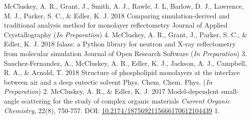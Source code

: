 \begin{cvpubys}
  \cvpuby
	{McCluskey, A. R., Grant, J., Smith, A. J., Rawle, J. L, Barlow, D. J., Lawrence, M. J., Parker, S. C., \& Edler, K. J.}
    {2018}
    {Comparing simulation-derived and traditional analysis method for monolayer reflectometry}
    {Journal of Applied Crystallography (\emph{In Preparation})}
    {4.}
  \cvpuby
    {McCluskey, A. R., Grant, J., Parker, S. C., \& Edler, K. J.}
    {2018}
    {falass: a Python library for neutron and X-ray reflectometry from molecular simulation}
    {Journal of Open Research Software (\emph{In Preparation})}
    {3.}
  \cvpuby
    {Sanchez-Fernandez, A., McCluskey, A. R., Edler, K. J., Jackson, A. J., Campbell, R. A., \& Arnold, T.}
    {2018}
    {Structure of phospholipid monolayers at the interface between air and a deep eutectic solvent}
    {Phys. Chem. Chem. Phys. (\emph{In Preparation})}
    {2.}
  \cvpuby
    {McCluskey, A. R., \& Edler, K. J.}
    {2017}
    {Model-dependent small-angle scattering for the study of complex organic materials}
	{\emph{Current Organic Chemistry}, 22(8), 750-757. DOI: \href{10.2174/1875692115666170612104439}{10.2174/1875692115666170612104439}}
    {1.}
\end{cvpubys}
